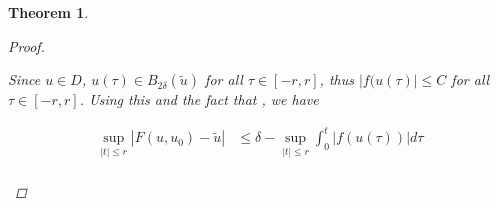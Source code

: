 \documentclass{article}
\newtheorem{theorem}{Theorem}[section]
\begin{document}
\begin{theorem}
\begin{proof}
\begin{enumerate}
Since $u \in D$, $u(\tau) \in B_{2 \delta}(\tilde{u})$ for all $\tau \in [-r, r]$, thus $|f(u(\tau)| \leq C$ for all $\tau \in [-r, r]$. Using this and the fact that , we have

\begin{align*}
\sup_{|t| \leq r} |F(u, u_0) - \tilde{u}|
&\leq \delta - \sup_{|t| \leq r} \int_0^t |f(u(\tau))| d \tau \\
\end{align*}





\end{enumerate}
\end{proof}
\end{theorem}
\end{document}

